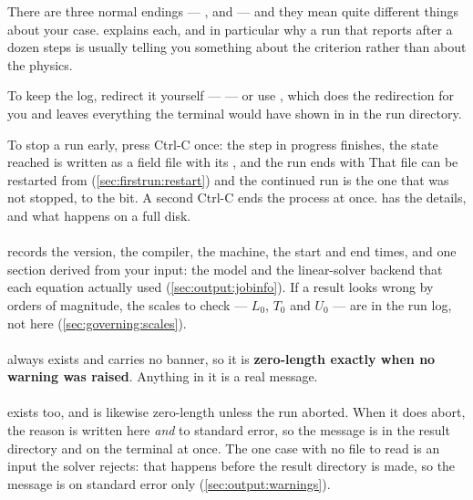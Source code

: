 There are three normal endings --- ,
 and  --- and they mean quite different
things about your case.  explains each, and
in particular why a run that reports  after a dozen steps is
usually telling you something about the criterion rather than about the physics.

To keep the log, redirect it yourself ---  ---
or use , which does the redirection for you and leaves
everything the terminal would have shown in  in the run
directory.

To stop a run early, press Ctrl-C once: the step in progress finishes, the
state reached is written as a field file with its , and the run
ends with  That file
can be restarted from (\cref{sec:firstrun:restart}) and the continued run is
the one that was not stopped, to the bit. A second Ctrl-C ends the process at
once.  has the details, and what happens on a full
disk.

\paragraph{} records the version, the compiler, the machine,
the start and end times, and one section derived from your input: the model and
the linear-solver backend that each equation actually used
(\cref{sec:output:jobinfo}). If a result looks wrong by orders of magnitude,
the scales to check --- $L_0$, $T_0$ and $U_0$ --- are in the run log, not here
(\cref{sec:governing:scales}).

\paragraph{} always exists and carries no banner, so it is
\textbf{zero-length exactly when no warning was raised}. Anything in it is a
real message.

\paragraph{} exists too, and is likewise zero-length
unless the run aborted. When it does abort, the reason is written here
\emph{and} to standard error, so the message is in the result directory and on
the terminal at once. The one case with no file to read is an input the solver
rejects: that happens before the result directory is made, so the message is on
standard error only (\cref{sec:output:warnings}).

